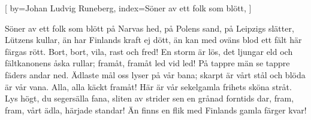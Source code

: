 

[
by={Johan Ludvig Runeberg},
index={Söner av ett folk som blött},
]

\beginverse*
Söner av ett folk som blött
på Narvas hed, på Polens sand, på Leipzigs slätter, Lützens kullar,
än har Finlands kraft ej dött,
än kan med oväns blod ett fält här färgas rött.
Bort, bort, vila, rast och fred!
En storm är lös, det ljungar eld och fältkanonens åska rullar;
framåt, framåt led vid led!
På tappre män se tappre fäders andar ned.
Ädlaste mål
oss lyser på vår bana;
skarpt är vårt stål
och blöda är vår vana.
Alla, alla käckt framåt!
Här är vår sekelgamla frihets sköna stråt.
Lys högt, du segersälla fana,
sliten av strider sen en grånad forntids dar,
fram, fram, vårt ädla, härjade standar!
Än finns en flik med Finlands gamla färger kvar!
\endverse
\endsong


